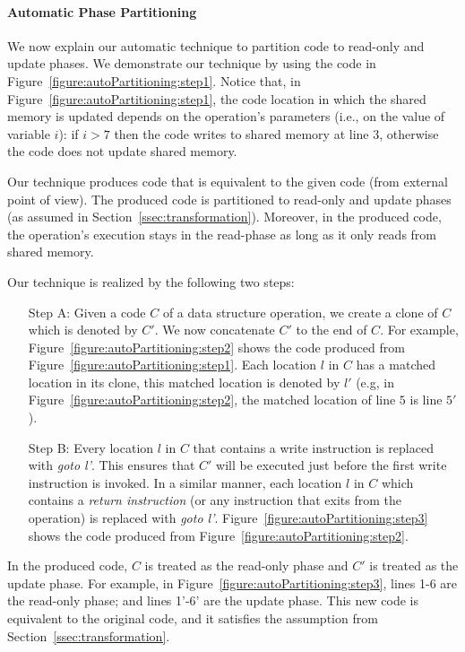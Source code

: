 \paragraph{Automatic Phase Partitioning}
We now explain our automatic technique to partition code to read-only and update phases.
We demonstrate our technique by using the code in Figure~\ref{figure:autoPartitioning:step1}.
Notice that, in Figure~\ref{figure:autoPartitioning:step1}, the code location in which the shared memory is updated depends on the operation's parameters (i.e., on the value of variable $i$): if $i>7$ then the code writes to shared memory at line $3$, otherwise the code does not update shared memory.

Our technique produces code that is equivalent to the given code (from external point of view). The produced code is partitioned to
read-only and update phases (as assumed in Section~\ref{ssec:transformation}). Moreover, in the produced code, the operation's execution stays in the read-phase as long as it only reads from shared memory.

\noindent Our technique is realized by the following two steps:
\begin{itemize}
  \item [Step A:]
Given a code $C$ of a data structure operation, we create a clone of $C$ which is denoted by $C'$.
We now concatenate $C'$ to the end of $C$.
For example, Figure~\ref{figure:autoPartitioning:step2} shows the code produced from Figure~\ref{figure:autoPartitioning:step1}.
Each location $l$ in $C$ has a matched location in its clone, this matched location is denoted by $l'$
(e.g, in Figure~\ref{figure:autoPartitioning:step2}, the matched location of line $5$ is line $5'$).
  \item [Step B:]
Every location $l$ in $C$ that contains a write instruction is replaced with \emph{goto l'}.
This ensures that $C'$ will be executed just before the first write instruction is invoked.
In a similar manner, each location $l$ in $C$ which contains a \emph{return instruction} (or any instruction that exits from the operation)
is replaced with \emph{goto l'}.
Figure~\ref{figure:autoPartitioning:step3} shows the code produced from Figure~\ref{figure:autoPartitioning:step2}.
\end{itemize}




In the produced code, $C$ is treated as the read-only phase  and $C'$ is treated as the update phase.
For example, in Figure~\ref{figure:autoPartitioning:step3}, lines 1-6 are the read-only phase; and lines 1'-6' are the update phase.
This new code is equivalent to the original code, and it satisfies the assumption from Section~\ref{ssec:transformation}.






